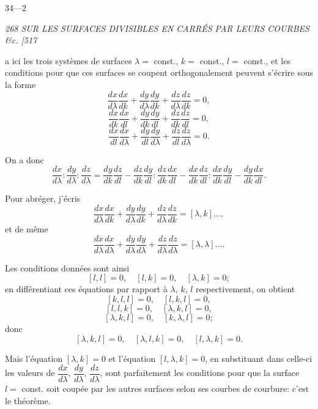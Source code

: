 \documentclass[11pt,a4paper]{book}
\begin{document}
\medskip

\hfill 34---2

\clearpage

\noindent\textit{268 \hfill SUR LES SURFACES DIVISIBLES EN CARR\'ES PAR LEURS COURBES \&c. \hfill [517}

\medskip

a ici les trois syst\`emes de surfaces $\lambda = $ const., $k = $ const., $l = $ const., et les conditions
pour que ces surfaces se coupent orthogonalement peuvent s'\'ecrire sous la forme
\[
\frac{dx}{d\lambda}\frac{dx}{dk} + \frac{dy}{d\lambda}\frac{dy}{dk} + \frac{dz}{d\lambda}\frac{dz}{dk} = 0,
\]
\[
\frac{dx}{dk}\frac{dx}{dl} + \frac{dy}{dk}\frac{dy}{dl} + \frac{dz}{dk}\frac{dz}{dl} = 0,
\]
\[
\frac{dx}{dl}\frac{dx}{d\lambda} + \frac{dy}{dl}\frac{dy}{d\lambda} + \frac{dz}{dl}\frac{dz}{d\lambda} = 0.
\]

On a donc
\[
\frac{dx}{d\lambda} : \frac{dy}{d\lambda} : \frac{dz}{d\lambda} = \frac{dy}{dk}\frac{dz}{dl} - \frac{dz}{dk}\frac{dy}{dl} : \frac{dz}{dk}\frac{dx}{dl} - \frac{dx}{dk}\frac{dz}{dl} : \frac{dx}{dk}\frac{dy}{dl} - \frac{dy}{dk}\frac{dx}{dl}.
\]

Pour abr\'eger, j'\'ecris
\[
\frac{dx}{d\lambda}\frac{dx}{dk} + \frac{dy}{d\lambda}\frac{dy}{dk} + \frac{dz}{d\lambda}\frac{dz}{dk} = [\lambda, k] \ldots,
\]
et de m\^eme
\[
\frac{dx}{d\lambda}\frac{dx}{d\lambda} + \frac{dy}{d\lambda}\frac{dy}{d\lambda} + \frac{dz}{d\lambda}\frac{dz}{d\lambda} = [\lambda, \lambda] \ldots.
\]

Les conditions donn\'ees sont ainsi
\[
[l, l] = 0, \quad [l, k] = 0, \quad [\lambda, k] = 0;
\]
en diff\'erentiant ces \'equations par rapport \`a $\lambda$, $k$, $l$ respectivement, on obtient
\[
[k, l, l] = 0, \quad [l, k, l] = 0,
\]
\[
[l, l, k] = 0, \quad [\lambda, k, l] = 0,
\]
\[
[\lambda, k, l] = 0, \quad [k, \lambda, l] = 0;
\]
donc
\[
[\lambda, k, l] = 0, \quad [\lambda, l, k] = 0, \quad [l, \lambda, k] = 0.
\]

Mais l'\'equation $[\lambda, k] = 0$ et l'\'equation $[l, \lambda, k] = 0$, en substituant dans celle-ci les valeurs
de $\dfrac{dx}{d\lambda}$, $\dfrac{dy}{d\lambda}$, $\dfrac{dz}{d\lambda}$, sont parfaitement les conditions pour que la surface $l = $ const. soit
coup\'ee par les autres surfaces selon ses courbes de courbure: c'est le th\'eor\`eme.

\clearpage

\end{document}

